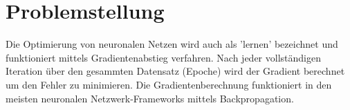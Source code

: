 %
%
%
\section{Problemstellung
\label{ableitung:section:problemstellung}}
Die Optimierung von neuronalen Netzen wird auch als 'lernen' bezeichnet und funktioniert mittels Gradientenabstieg verfahren.
Nach jeder vollständigen Iteration über den gesammten Datensatz (Epoche) wird der Gradient berechnet um den Fehler zu minimieren. Die Gradientenberechnung funktioniert in den meisten neuronalen Netzwerk-Frameworks mittels Backpropagation.

%		
